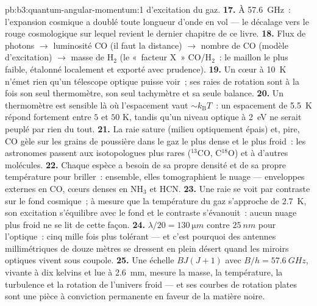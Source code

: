 \begin{solution}{pb:b3:quantum-angular-momentum:1}
d'excitation du gaz.
\textbf{17.} À \qty{57.6}{GHz}~: l'expansion cosmique a doublé toute
longueur d'onde en vol --- le décalage vers le rouge cosmologique sur
lequel revient le dernier chapitre de ce livre.
\textbf{18.} Flux de photons $\to$ luminosité CO (il faut la
distance) $\to$ nombre de CO (modèle d'excitation) $\to$ masse de
H$_2$ (le «~facteur X~» CO/H$_2$~: le maillon le plus faible, étalonné
localement et exporté avec prudence).
\textbf{19.} Un cœur à \qty{10}{K} n'émet rien qu'un télescope
optique puisse voir~; ses raies de rotation sont à la fois son seul
thermomètre, son seul tachymètre et sa seule balance.
\textbf{20.} Un thermomètre est sensible là où l'espacement vaut $\sim
k_{\text{B}}T$~: un espacement de \qty{5.5}{K}
répond fortement entre $5$ et $50$ K, tandis qu'un niveau optique à
\qty{2}{eV} ne serait peuplé par rien du tout.
\textbf{21.} La raie sature (milieu optiquement épais) et, pire, CO
gèle sur les grains de poussière dans le gaz le plus dense et le plus
froid~: les astronomes passent aux isotopologues plus rares
($^{13}$CO, C$^{18}$O) et à d'autres molécules.
\textbf{22.} Chaque espèce a besoin de sa propre densité et de sa
propre température pour briller~: ensemble, elles tomographient le
nuage --- enveloppes externes en CO, cœurs denses en NH$_3$ et HCN.
\textbf{23.} Une raie se voit par contraste sur le fond cosmique~; à
mesure que la température du gaz s'approche de \qty{2.7}{K}, son
excitation s'équilibre avec le fond et le contraste s'évanouit~:
aucun nuage plus froid ne se lit de cette façon.
\textbf{24.} $\lambda/20 = \qty{130}{\micro m}$ contre
$\qty{25}{nm}$ pour l'optique~: cinq mille fois plus tolérant ---
et c'est pourquoi des antennes millimétriques de douze mètres se
dressent en plein désert quand les miroirs optiques vivent sous
coupole.
\textbf{25.} Une échelle $BJ(J+1)$ avec $B/h = \qty{57.6}{GHz}$,
vivante à dix kelvins et lue à \qty{2.6}{mm}, mesure la masse, la
température, la turbulence et la rotation de l'univers froid --- et
ses courbes de rotation plates sont une pièce à conviction permanente
en faveur de la matière noire.
\end{solution}
